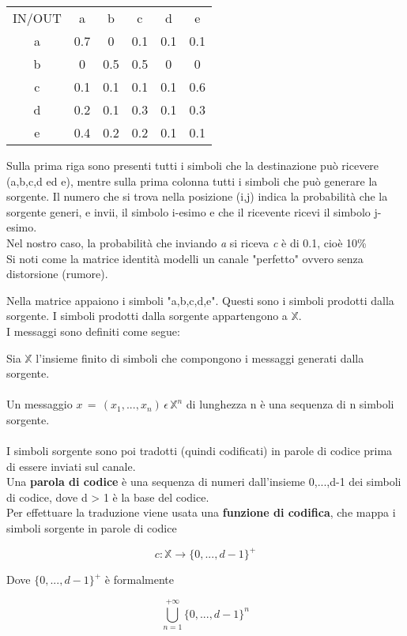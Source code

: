 \documentclass{article}
\begin{document}
    \begin{center}
        \begin{tabular}{ c c c c c c }
            IN/OUT &  a & b & c & d & e  \\
            a & 0.7 & 0 & 0.1 & 0.1 & 0.1  \\
            b & 0 & 0.5 & 0.5 & 0 & 0 \\
            c & 0.1 & 0.1 & 0.1 & 0.1 & 0.6 \\
            d & 0.2 & 0.1 & 0.3 & 0.1 & 0.3   \\
            e & 0.4 & 0.2 & 0.2 & 0.1 & 0.1 \\
        \end{tabular}
    \end{center}

    Sulla prima riga sono presenti tutti i simboli che la destinazione può ricevere (a,b,c,d ed e), mentre sulla prima colonna tutti i simboli che può generare la sorgente. Il numero che si trova nella posizione (i,j) indica la probabilità che  la sorgente generi, e invii, il simbolo i-esimo e che il ricevente ricevi il simbolo j-esimo. \\
    Nel nostro caso,  la probabilità che inviando \textit{a} si riceva \textit{c} è di 0.1, cioè 10\% \\
    Si noti come la matrice identità modelli un canale "perfetto" ovvero senza distorsione (rumore).
    \vspace{10px}

    \noindent Nella matrice appaiono i simboli "a,b,c,d,e". Questi sono i simboli prodotti dalla sorgente. I simboli prodotti dalla sorgente appartengono a $\mathbb{X}$.
    \\
    I messaggi sono definiti come segue:
    \vspace{5px}

    \noindent Sia $\mathbb{X}$ l'insieme finito di simboli che compongono i messaggi generati dalla sorgente. \\ \\
    Un messaggio $x \, = \,(x_1,...,x_n)\, \epsilon \, \mathbb{X}^n$ di lunghezza n è una sequenza di n simboli sorgente.
    \\ \\
    I simboli sorgente sono poi tradotti (quindi codificati) in parole di codice prima di essere inviati sul canale. \\
    Una \textbf{parola di codice} è una sequenza di numeri dall'insieme {0,...,d-1} dei simboli di codice, dove d > 1 è la base del codice.\\
    Per effettuare la traduzione viene usata una \textbf{funzione di codifica}, che mappa i simboli sorgente in parole di codice

    $$c : \mathbb{X} \rightarrow \{0,...,d-1\}^+$$

    Dove $\{0,...,d-1\}^+$ è formalmente

    $$\bigcup_{n=1}^{+\infty}\{0,...,d-1\}^n$$
\end{document}

